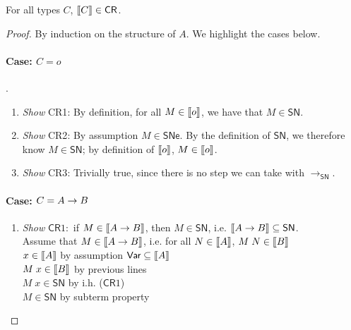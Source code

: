\documentclass{article}
\newcommand{\SN}{\mathsf{SN}}
\newcommand{\SNe}{\mathsf{SNe}}
\newcommand{\CR}{\mathsf{CR}}
\newcommand{\redSN}{\longrightarrow_\SN}
\def\lv{\mathopen{{[\kern-0.14em[}}}    %
\def\rv{\mathclose{{]\kern-0.14em]}}}   %
\newcommand{\den}[1]{\lv #1 \rv}
\begin{document}
\begin{theorem}
For all types $C$, $\den{C}  \in \CR$.
\end{theorem}
\begin{proof}
By induction on the structure of $A$. We highlight the cases below. 

\paragraph{Case: $C = o$}.\\
\begin{enumerate}
\item \textit{Show} \textsf{CR1}: By definition, for all $M \in \den{o}$, we have that $M \in \SN$. 
\item \textit{Show} \textsf{CR2}: By assumption $M \in \SNe$. By the definition of $\SN$, we therefore know $M \in \SN$; by definition of $\den{o}$, $M \in \den{o}$.
\item \textit{Show} \textsf{CR3}: Trivially true, since there is no step we can take with $\redSN$.
\end{enumerate}

  
\paragraph{Case: $C = A \rightarrow B$}

\begin{enumerate}
\item \textit{Show} $\CR 1:$ if $M \in \den{A \arrow B}$, then $M \in \SN$, i.e. $\den{A \arrow B} \subseteq \SN$. \\[0.5em]
Assume that $M \in \den{A \arrow B}$, i.e. for all $N \in \den{A}$, $M\;N \in \den{B}$ \\
$x \in \den{A}$ \hfill by assumption $\textsf{Var} \subseteq \den{A}$ \\
$M\;x \in \den{B}$ \hfill by previous lines \\
$M\;x \in \SN$ \hfill by i.h. ($\CR1$) \\
$M \in \SN$ \hfill by subterm property\\[1em]



\end{enumerate}
\end{proof}
\end{document}
